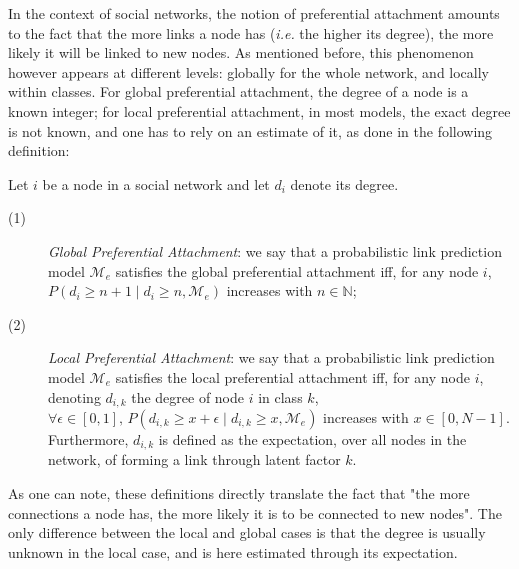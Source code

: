 \documentclass{llncs}
\newcommand{\pr}{P}
\begin{document}
In the context of social networks, the notion of preferential attachment amounts to the fact that the more links a node has (\textit{i.e.} the higher its degree), the more likely it will be linked to new nodes. As mentioned before, this phenomenon however appears at different levels: globally for the whole network, and locally within classes. For global preferential attachment, the degree of a node is a known integer; for local preferential attachment, in most models, the exact degree is not known, and one has to rely on an estimate of it, as done in the following definition:
%
\begin{definition}
Let $i$ be a node in a social network and let $d_i$ denote its degree. 
\begin{description}
 \item[(1)] \emph{Global Preferential Attachment}: we say that a probabilistic link prediction model $\mathcal{M}_e$ satisfies the global preferential attachment iff, for any node $i$, $\pr(d_i \ge n+1 \mid d_i \ge n, \mathcal{M}_e)$ increases with $n \in \mathbb{N}$;
 \item[(2)] \emph{Local Preferential Attachment}: we say that a probabilistic link prediction model $\mathcal{M}_e$ satisfies the local preferential attachment iff, for any node $i$, denoting $d_{i,k}$ the degree of node $i$ in class $k$, $\forall \epsilon \in [0,1], \, \pr(d_{i,k} \ge x+\epsilon \mid d_{i,k} \ge x, \mathcal{M}_e)$ increases with $x \in [0,N-1]$. Furthermore, $d_{i,k}$ is defined as the expectation, over all nodes in the network, of forming a link through latent factor $k$.
\end{description}
\label{def:burst-soc-net}
\end{definition}
%
As one can note, these definitions directly translate the fact that "the more connections a node has, the more likely it is to be connected to new nodes". The only difference between the local and global cases is that the degree is usually unknown in the local case, and is here estimated through its expectation.
\end{document}
